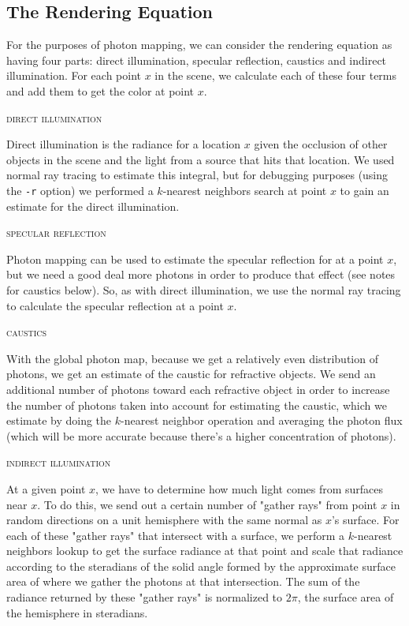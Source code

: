 \documentclass{article}
\begin{document}
\subsection{The Rendering Equation} %
\label{sub:therenderingequation}
For the purposes of photon mapping, we can consider the rendering equation as having four parts: direct illumination, specular reflection, caustics and indirect illumination. For each point $x$ in the scene, we calculate each of these four terms and add them to get the color at point $x$.

\begin{center}\textsc{direct illumination}\end{center} 

Direct illumination is the radiance for a location $x$ given the occlusion of other objects in the scene and the light from a source that hits that location. We used normal ray tracing to estimate this integral, but for debugging purposes (using the \verb+-r+ option) we performed a $k$-nearest neighbors search at point $x$ to gain an estimate for the direct illumination.

\begin{center}\textsc{specular reflection}\end{center} 
Photon mapping can be used to estimate the specular reflection for at a point $x$, but we need a good deal more photons in order to produce that effect (see notes for caustics below). So, as with direct illumination, we use the normal ray tracing to calculate the specular reflection at a point $x$.

\begin{center}\textsc{caustics}\end{center} 
With the global photon map, because we get a relatively even distribution of photons, we get an estimate of the caustic for refractive objects. We send an additional number of photons toward each refractive object in order to increase the number of photons taken into account for estimating the caustic, which we estimate by doing the $k$-nearest neighbor operation and averaging the photon flux (which will be more accurate because there's a higher concentration of photons).

\begin{center}\textsc{indirect illumination}\end{center} 
At a given point $x$, we have to determine how much light comes from surfaces near $x$. To do this, we send out a certain number of "gather rays" from point $x$ in random directions on a unit hemisphere with the same normal as $x$'s surface. For each of these "gather rays" that intersect with a surface, we perform a $k$-nearest neighbors lookup to get the surface radiance at that point and scale that radiance according to the steradians of the solid angle formed by the approximate surface area of where we gather the photons at that intersection. The sum of the radiance returned by these "gather rays" is normalized to $2\pi$, the surface area of the hemisphere in steradians.
\end{document}
